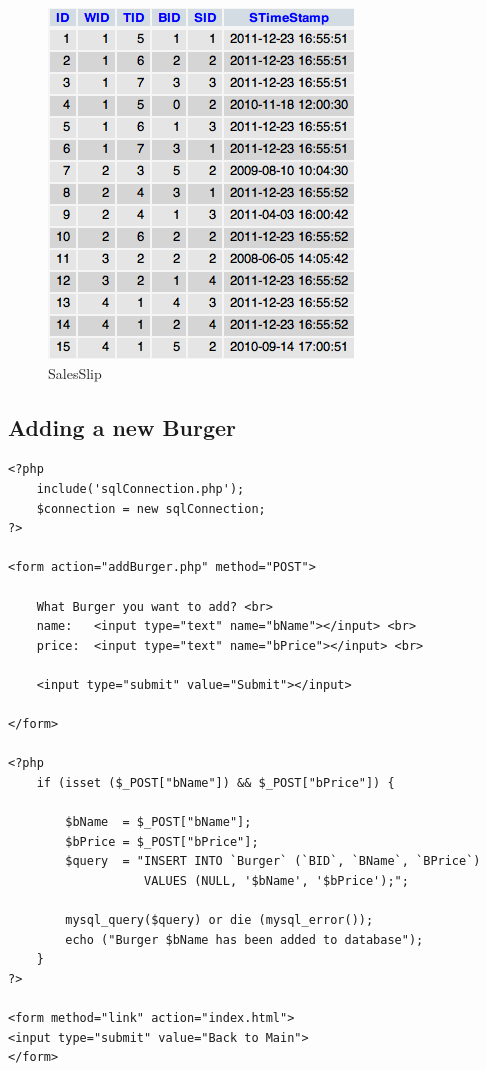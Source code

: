 \documentclass[10pt, a4paper]{article}
\begin{document}
\begin{figure}[htb]
	\centering
	\includegraphics[scale=0.9]{fig/salesslip.png}
	\caption{SalesSlip}
\end{figure}

\pagebreak
\subsection{Adding a new Burger}

\begin{lstlisting}[caption=addBurger.php]
<?php
    include('sqlConnection.php');
    $connection = new sqlConnection;
?>

<form action="addBurger.php" method="POST">

    What Burger you want to add? <br>
    name:   <input type="text" name="bName"></input> <br>
    price:  <input type="text" name="bPrice"></input> <br>

    <input type="submit" value="Submit"></input>

</form>

<?php
    if (isset ($_POST["bName"]) && $_POST["bPrice"]) {
        
        $bName  = $_POST["bName"];
        $bPrice = $_POST["bPrice"];
        $query  = "INSERT INTO `Burger` (`BID`, `BName`, `BPrice`)
                   VALUES (NULL, '$bName', '$bPrice');";
        
        mysql_query($query) or die (mysql_error());
        echo ("Burger $bName has been added to database");
    }
?>

<form method="link" action="index.html">
<input type="submit" value="Back to Main">
</form>
\end{lstlisting}
\end{document}

